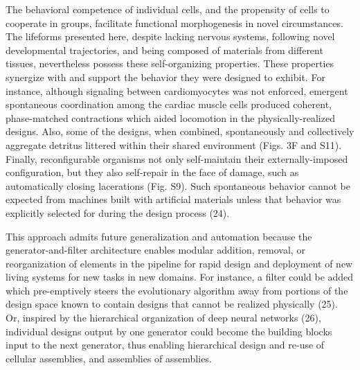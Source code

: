 The behavioral competence of individual cells, and the propensity of cells to cooperate in groups, facilitate functional morphogenesis in novel circumstances. The lifeforms presented here, despite lacking nervous systems, following novel developmental trajectories, and being composed of materials from different tissues, nevertheless possess these self-organizing properties. These properties synergize with and support the behavior they were designed to exhibit. For instance, although signaling between cardiomyocytes was not enforced, emergent spontaneous coordination among the cardiac muscle cells produced coherent, phase-matched contractions which aided locomotion in the physically-realized designs. Also, some of the designs, when combined, spontaneously and collectively aggregate detritus littered within their shared environment (Figs. 3F and S11). Finally, reconfigurable organisms not only self-maintain their externally-imposed configuration, but they also self-repair in the face of damage, such as automatically closing lacerations (Fig. S9). Such spontaneous behavior cannot be expected from machines built with artificial materials unless that behavior was explicitly selected for during the design process (24).

This approach admits future generalization and automation because the generator-and-filter architecture enables modular addition, removal, or reorganization of elements in the pipeline for rapid design and deployment of new living systems for new tasks in new domains. For instance, a filter could be added which pre-emptively steers the evolutionary algorithm away from portions of the design space known to contain designs that cannot be realized physically (25). Or, inspired by the hierarchical organization of deep neural networks (26), individual designs output by one generator could become the building blocks input to the next generator, thus enabling hierarchical design and re-use of cellular assemblies, and assemblies of assemblies.

